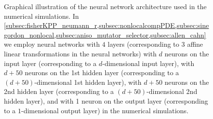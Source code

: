 \begin{figure}
	\caption{Graphical illustration of the neural network architecture used in the numerical simulations. In \cref{subsec:fisherKPP_neumann_r,subsec:nonlocalcompPDE,subsec:sinegordon_nonlocal,subsec:aniso_mutator_selector,subsec:allen_cahn} we employ neural networks with $4$ layers
	(corresponding to $3$ affine linear transformations in the neural networks) 
	with $d$ neurons on the input layer (corresponding to a $d$-dimensional input layer), 
	with $d + 50$ neurons on the 1st hidden layer (corresponding to a $(d+50)$-dimensional 1st hidden layer),
	with $d + 50$ neurons on the 2nd hidden layer (corresponding to a $(d+50)$-dimensional 2nd hidden layer), and 
	with 1 neuron on the output layer (corresponding to a $1$-dimensional output layer) in the numerical simulations. 
	}
	\label{fig:nn}
\end{figure}

